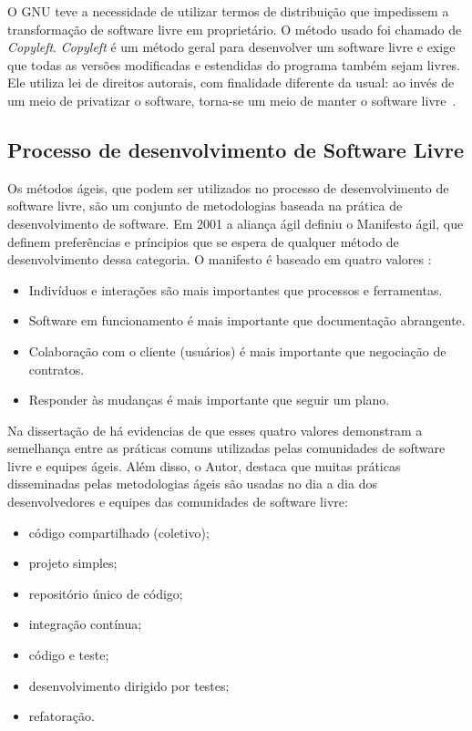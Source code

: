 O GNU teve a necessidade de utilizar termos de distribuição que impedissem a transformação de software livre em proprietário. O método usado foi chamado de \emph{Copyleft}. \emph{Copyleft} é um método geral para desenvolver um software livre e exige que todas as versões modificadas e estendidas do programa também sejam livres. Ele utiliza lei de direitos autorais, com finalidade diferente da usual: ao invés de um meio de privatizar o software, torna-se um meio de manter o software livre~\cite{stallman2009}.

\subsection{Processo de desenvolvimento de Software Livre}
\label{des-soft-livre}

Os métodos ágeis, que podem ser utilizados no processo de desenvolvimento de software livre, são um conjunto de metodologias baseada na prática de desenvolvimento de software. Em 2001 a aliança ágil definiu o Manifesto ágil, que definem preferências e príncipios que se espera de qualquer método de desenvolvimento dessa categoria. O manifesto é baseado em quatro valores \cite{beck2001agile}:
\begin{itemize}
\item Indivíduos e interações são mais importantes que processos e ferramentas.
\item Software em funcionamento é mais importante que documentação abrangente.
\item Colaboração com o cliente (usuários) é mais importante que negociação de contratos.
\item Responder às mudanças é mais importante que seguir um plano.
\end{itemize}

Na dissertação de  há evidencias de que esses quatro valores demonstram a semelhança entre as práticas comuns utilizadas pelas comunidades de software livre e equipes ágeis. Além disso, o Autor, destaca que muitas práticas disseminadas pelas metodologias ágeis são usadas no dia a dia dos desenvolvedores e equipes das comunidades de software livre:
\begin{itemize}
\item código compartilhado (coletivo);
\item projeto simples;
\item repositório único de código;
\item integração contínua;
\item código e teste;
\item desenvolvimento dirigido por testes;
\item refatoração.
\end{itemize}

